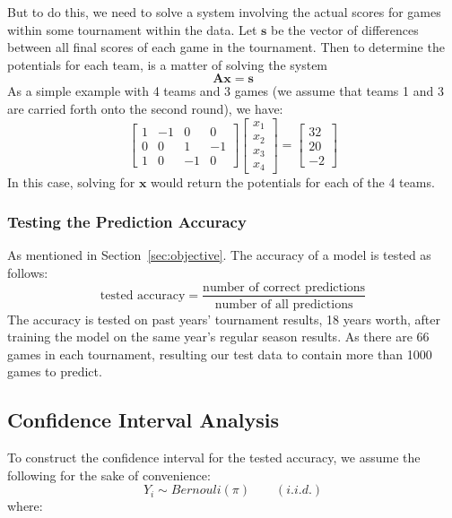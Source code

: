 \documentclass{article} %
\newcommand{\iid}{i.i.d.}
\begin{document}
But to do this, we need to solve a system involving the actual scores for games within some tournament within the data. Let $\mathbf{s}$ be the vector of differences between all final scores of each game in the tournament. Then to determine the potentials for each team, is a matter of solving the system 
\[\mathbf{A}\mathbf{x} = \mathbf{s} \]
As a simple example with 4 teams and 3 games (we assume that teams 1 and 3 are carried forth onto the second round), we have:
\[
\begin{bmatrix}
	1&-1&0&0\\
	0&0&1&-1\\
	1&0&-1&0
\end{bmatrix}\begin{bmatrix}
	x_1\\x_2\\x_3\\x_4
\end{bmatrix} = \begin{bmatrix}
	32\\20\\-2
\end{bmatrix}
\]
In this case, solving for $\mathbf{x}$ would return the potentials for each of the 4 teams.
\subsubsection{Testing the Prediction Accuracy}
As mentioned in Section~\ref{sec:objective}. The accuracy of a model is tested as follows: 
\begin{equation}
		\mbox{tested accuracy} = \frac{\mbox{number of correct predictions}}{\mbox{number of all predictions}}
\end{equation}
The accuracy is tested on past years' tournament results, 18 years worth, after training the model on the same year's regular season results.  As there are 66 games in each tournament, resulting our test data to contain more than 1000 games to predict.


\subsection{Confidence Interval Analysis}
To construct the confidence interval for the tested accuracy, we assume the following for the sake of convenience:
\begin{equation}
		Y_i \sim Bernouli(\pi)\qquad(\iid)
\end{equation}
where:
\end{document}
